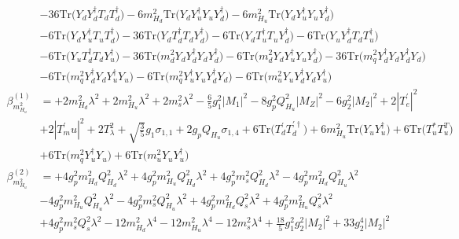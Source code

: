 \begin{align}
 &-36 \mbox{Tr}\Big({Y_d  Y_{d}^{\dagger}  T_d  T_{d}^{\dagger}}\Big) -6 m_{H_d}^2 \mbox{Tr}\Big({Y_d  Y_{u}^{\dagger}  Y_u  Y_{d}^{\dagger}}\Big) -6 m_{H_u}^2 \mbox{Tr}\Big({Y_d  Y_{u}^{\dagger}  Y_u  Y_{d}^{\dagger}}\Big) \nonumber \\ 
 &-6 \mbox{Tr}\Big({Y_d  Y_{u}^{\dagger}  T_u  T_{d}^{\dagger}}\Big) -36 \mbox{Tr}\Big({Y_d  T_{d}^{\dagger}  T_d  Y_{d}^{\dagger}}\Big) -6 \mbox{Tr}\Big({Y_d  T_{u}^{\dagger}  T_u  Y_{d}^{\dagger}}\Big) -6 \mbox{Tr}\Big({Y_u  Y_{d}^{\dagger}  T_d  T_{u}^{\dagger}}\Big) \nonumber \\ 
 &-6 \mbox{Tr}\Big({Y_u  T_{d}^{\dagger}  T_d  Y_{u}^{\dagger}}\Big) -36 \mbox{Tr}\Big({m_d^2  Y_d  Y_{d}^{\dagger}  Y_d  Y_{d}^{\dagger}}\Big) -6 \mbox{Tr}\Big({m_d^2  Y_d  Y_{u}^{\dagger}  Y_u  Y_{d}^{\dagger}}\Big) -36 \mbox{Tr}\Big({m_q^2  Y_{d}^{\dagger}  Y_d  Y_{d}^{\dagger}  Y_d}\Big) \nonumber \\ 
 &-6 \mbox{Tr}\Big({m_q^2  Y_{d}^{\dagger}  Y_d  Y_{u}^{\dagger}  Y_u}\Big) -6 \mbox{Tr}\Big({m_q^2  Y_{u}^{\dagger}  Y_u  Y_{d}^{\dagger}  Y_d}\Big) -6 \mbox{Tr}\Big({m_u^2  Y_u  Y_{d}^{\dagger}  Y_d  Y_{u}^{\dagger}}\Big) \\ 
\beta_{m_{H_u}^2}^{(1)} & =  
+2 m_{H_d}^2 \lambda^{2} +2 m_{H_u}^2 \lambda^{2} +2 m^2_{s} \lambda^{2} -\frac{6}{5} g_{1}^{2} |M_1|^2 -8 g_{p}^{2} Q_{H_u}^{2} |M_Z|^2 -6 g_{2}^{2} |M_2|^2 +2 |T^{\prime}_e|^2 \nonumber \\ 
 &+2 |T^{\prime}_mu|^2 +2 T_{\lambda}^{2} +\sqrt{\frac{3}{5}} g_1 \sigma_{1,1} +2 g_p Q_{H_u} \sigma_{1,4} +6 \mbox{Tr}\Big({T^{\prime}_d  T_{d}^{\prime \dagger}}\Big) +6 m_{H_u}^2 \mbox{Tr}\Big({Y_u  Y_{u}^{\dagger}}\Big) +6 \mbox{Tr}\Big({T_u^*  T_{u}^{T}}\Big) \nonumber \\ 
 &+6 \mbox{Tr}\Big({m_q^2  Y_{u}^{\dagger}  Y_u}\Big) +6 \mbox{Tr}\Big({m_u^2  Y_u  Y_{u}^{\dagger}}\Big) \\ 
\beta_{m_{H_u}^2}^{(2)} & =  
+4 g_{p}^{2} m_{H_d}^2 Q_{H_d}^{2} \lambda^{2} +4 g_{p}^{2} m_{H_u}^2 Q_{H_d}^{2} \lambda^{2} +4 g_{p}^{2} m^2_{s} Q_{H_d}^{2} \lambda^{2} -4 g_{p}^{2} m_{H_d}^2 Q_{H_u}^{2} \lambda^{2} \nonumber \\ 
 &-4 g_{p}^{2} m_{H_u}^2 Q_{H_u}^{2} \lambda^{2} -4 g_{p}^{2} m^2_{s} Q_{H_u}^{2} \lambda^{2} +4 g_{p}^{2} m_{H_d}^2 Q_{s}^{2} \lambda^{2} +4 g_{p}^{2} m_{H_u}^2 Q_{s}^{2} \lambda^{2} \nonumber \\ 
 &+4 g_{p}^{2} m^2_{s} Q_{s}^{2} \lambda^{2} -12 m_{H_d}^2 \lambda^{4} -12 m_{H_u}^2 \lambda^{4} -12 m^2_{s} \lambda^{4} +\frac{18}{5} g_{1}^{2} g_{2}^{2} |M_2|^2 +33 g_{2}^{4} |M_2|^2 \nonumber \\ 

\end{align}
